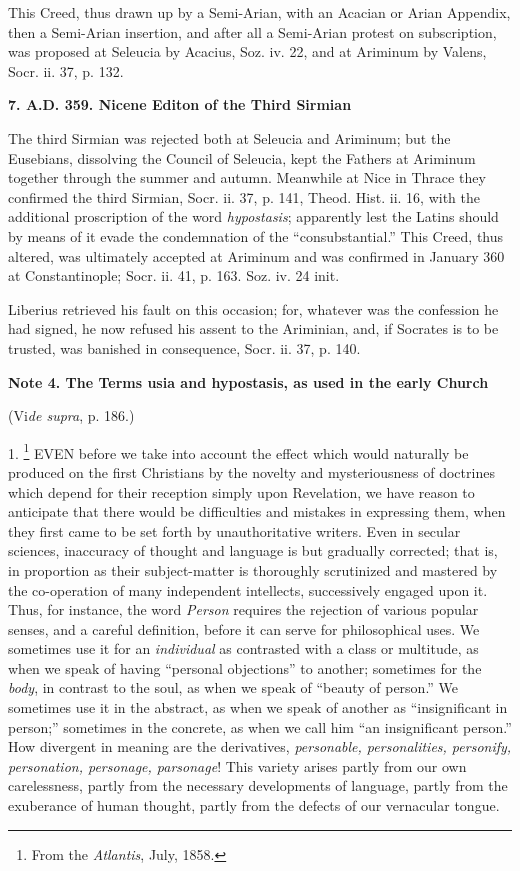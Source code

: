 This Creed, thus drawn up by a Semi-Arian, with an Acacian or Arian
Appendix, then a Semi-Arian insertion, and after all a Semi-Arian
protest on subscription, was proposed at Seleucia by Acacius, Soz. iv.
22, and at Ariminum by Valens, Socr. ii. 37, p. 132.

\textbf{7. A.D. 359. Nicene Editon of the Third
Sirmian}

The third Sirmian was rejected both at Seleucia and Ariminum; but
the Eusebians, dissolving the Council of Seleucia, kept the Fathers at
Ariminum together through the summer and autumn. Meanwhile at Nice in
Thrace they confirmed the third Sirmian, Socr. ii. 37, p. 141, Theod.
Hist. ii. 16, with the additional proscription of the word \emph{hypostasis};
apparently lest the Latins should by means of it evade the
condemnation of the ``consubstantial.'' This Creed, thus
altered, was ultimately accepted at Ariminum and was confirmed in
January 360 at Constantinople; Socr. ii. 41, p. 163. Soz. iv. 24 init.

Liberius retrieved his fault on this occasion; for, whatever was
the confession he had signed, he now refused his assent to the
Ariminian, and, if Socrates is to be trusted, was banished in
consequence, Socr. ii. 37, p. 140.

\textbf{Note 4. The Terms usia and hypostasis,
as used in the early Church}

(Vi\emph{de supra}, p. 186.)

1. \footnote{From the \emph{Atlantis}, July, 1858.} EVEN
before we take into account the effect which would naturally be
produced on the first Christians by the novelty and mysteriousness of
doctrines which depend for their reception simply upon Revelation, we
have reason to anticipate that there would be difficulties and
mistakes in expressing them, when they first came to be set forth by
unauthoritative writers. Even in secular sciences, inaccuracy of
thought and language is but gradually corrected; that is, in
proportion as their subject-matter is thoroughly scrutinized and
mastered by the co-operation of many independent intellects,
successively engaged upon it. Thus, for instance, the word \emph{Person}
requires the rejection of various popular senses, and a careful
definition, before it can serve for philosophical uses. We sometimes
use it for an \emph{individual} as contrasted with a class or
multitude, as when we speak of having ``personal objections''
to another; sometimes for the \emph{body}, in contrast to the soul, as
when we speak of ``beauty of person.'' We sometimes use it in
the abstract, as when we speak of another as ``insignificant in
person;'' sometimes in the concrete, as when we call him ``an
insignificant person.'' How divergent in meaning are the
derivatives, \emph{personable, personalities, personify, personation,
personage, parsonage}! This variety arises partly from our own
carelessness, partly from the necessary developments of language, partly from the exuberance of human thought, partly from the
defects of our vernacular tongue.

